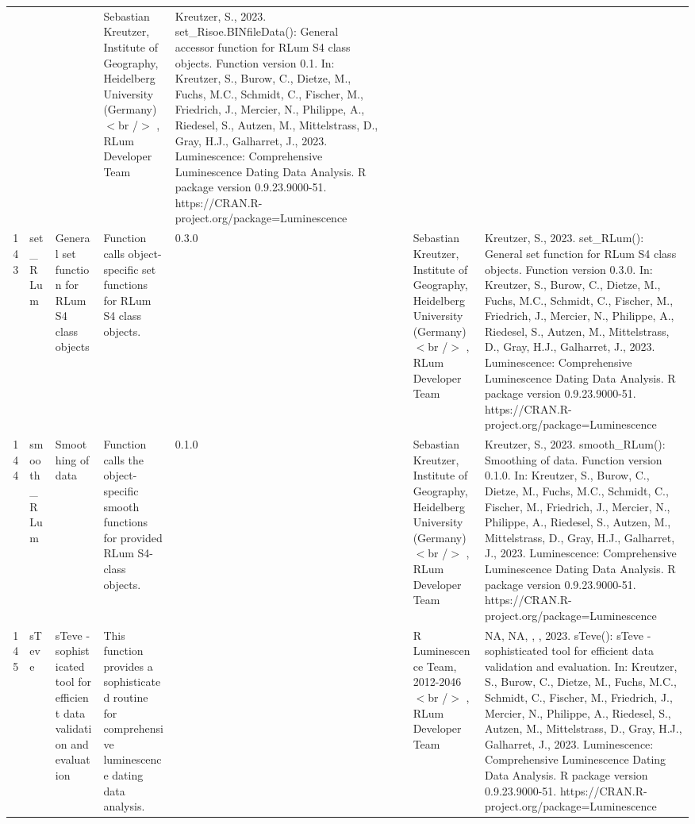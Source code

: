 \begin{table}[ht]
\begin{tabular}{rllllllll}
 &  &  & Sebastian Kreutzer, Institute of Geography, Heidelberg University (Germany)$<$br /$>$ , RLum Developer Team & Kreutzer, S., 2023. set\_Risoe.BINfileData(): General accessor function for RLum S4 class objects. Function version 0.1. In: Kreutzer, S., Burow, C., Dietze, M., Fuchs, M.C., Schmidt, C., Fischer, M., Friedrich, J., Mercier, N., Philippe, A., Riedesel, S., Autzen, M., Mittelstrass, D., Gray, H.J., Galharret, J., 2023. Luminescence: Comprehensive Luminescence Dating Data Analysis. R package version 0.9.23.9000-51. https://CRAN.R-project.org/package=Luminescence
 \\ 
  143 & set\_RLum & General set function for RLum S4 class objects & Function calls object-specific set functions for RLum S4 class objects. & 0.3.0
 &  &  & Sebastian Kreutzer, Institute of Geography, Heidelberg University (Germany)$<$br /$>$ , RLum Developer Team & Kreutzer, S., 2023. set\_RLum(): General set function for RLum S4 class objects. Function version 0.3.0. In: Kreutzer, S., Burow, C., Dietze, M., Fuchs, M.C., Schmidt, C., Fischer, M., Friedrich, J., Mercier, N., Philippe, A., Riedesel, S., Autzen, M., Mittelstrass, D., Gray, H.J., Galharret, J., 2023. Luminescence: Comprehensive Luminescence Dating Data Analysis. R package version 0.9.23.9000-51. https://CRAN.R-project.org/package=Luminescence
 \\ 
  144 & smooth\_RLum & Smoothing of data & Function calls the object-specific smooth functions for provided RLum S4-class objects. & 0.1.0
 &  &  & Sebastian Kreutzer, Institute of Geography, Heidelberg University (Germany)$<$br /$>$ , RLum Developer Team & Kreutzer, S., 2023. smooth\_RLum(): Smoothing of data. Function version 0.1.0. In: Kreutzer, S., Burow, C., Dietze, M., Fuchs, M.C., Schmidt, C., Fischer, M., Friedrich, J., Mercier, N., Philippe, A., Riedesel, S., Autzen, M., Mittelstrass, D., Gray, H.J., Galharret, J., 2023. Luminescence: Comprehensive Luminescence Dating Data Analysis. R package version 0.9.23.9000-51. https://CRAN.R-project.org/package=Luminescence
 \\ 
  145 & sTeve & sTeve - sophisticated tool for efficient data validation and evaluation & This function provides a sophisticated routine for comprehensive luminescence dating data analysis. &  &  &  & R Luminescence Team, 2012-2046$<$br /$>$ , RLum Developer Team & NA, NA, , , 2023. sTeve(): sTeve - sophisticated tool for efficient data validation and evaluation. In: Kreutzer, S., Burow, C., Dietze, M., Fuchs, M.C., Schmidt, C., Fischer, M., Friedrich, J., Mercier, N., Philippe, A., Riedesel, S., Autzen, M., Mittelstrass, D., Gray, H.J., Galharret, J., 2023. Luminescence: Comprehensive Luminescence Dating Data Analysis. R package version 0.9.23.9000-51. https://CRAN.R-project.org/package=Luminescence

\end{tabular}
\end{table}
